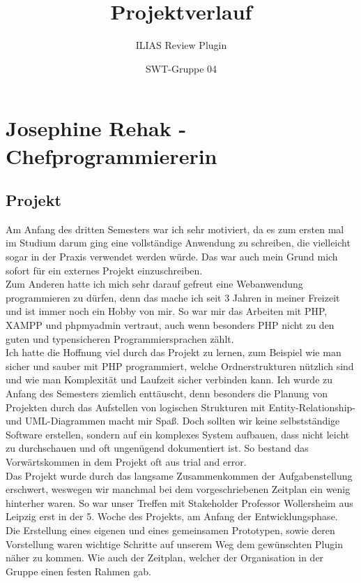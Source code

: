 \documentclass[a4paper]{scrreprt}
\begin{document}
 
\title{Projektverlauf}
\subtitle{ILIAS Review Plugin}
\author{SWT-Gruppe 04}
\maketitle

\tableofcontents


\chapter{Josephine Rehak - Chefprogrammiererin}
\section{Projekt}
Am Anfang des dritten Semesters war ich sehr motiviert, da es zum ersten mal im Studium darum ging eine vollständige Anwendung zu schreiben, die vielleicht sogar in der Praxis verwendet werden würde. Das war auch mein Grund mich sofort für ein externes Projekt einzuschreiben.\\
Zum Anderen hatte ich mich sehr darauf gefreut eine Webanwendung programmieren zu dürfen, denn das mache ich seit 3 Jahren in meiner Freizeit und ist immer noch ein Hobby von mir. So war mir das Arbeiten mit PHP, XAMPP und phpmyadmin vertraut, auch wenn besonders PHP nicht zu den guten und typensicheren Programmiersprachen zählt.
\\
 Ich hatte die Hoffnung viel durch das Projekt zu lernen, zum Beispiel wie man sicher  und sauber mit PHP programmiert, welche Ordnerstrukturen nützlich sind und wie man Komplexität und Laufzeit sicher verbinden kann.
Ich wurde zu Anfang des Semesters ziemlich enttäuscht, denn besonders die Planung von Projekten durch das Aufstellen von logischen Strukturen mit Entity-Relationship- und UML-Diagrammen macht mir Spaß. Doch sollten wir keine selbstständige Software erstellen, sondern auf ein komplexes System aufbauen, dass nicht leicht zu durchschauen und oft ungenügend dokumentiert ist. So bestand das Vorwärtskommen in dem Projekt oft aus trial and error. \\
Das Projekt wurde durch das langsame Zusammenkommen der Aufgabenstellung erschwert, weswegen wir manchmal bei dem vorgeschriebenen Zeitplan ein wenig hinterher waren. So war unser Treffen mit Stakeholder Professor Wollersheim aus Leipzig erst in der 5. Woche des Projekts, am Anfang der Entwicklungsphase. \\
Die Erstellung eines eigenen und eines gemeinsamen Prototypen, sowie deren Vorstellung waren wichtige Schritte auf unserem Weg dem gewünschten Plugin näher zu kommen. Wie auch der Zeitplan, welcher der Organisation in der Gruppe einen festen Rahmen gab.  
\end{document}
